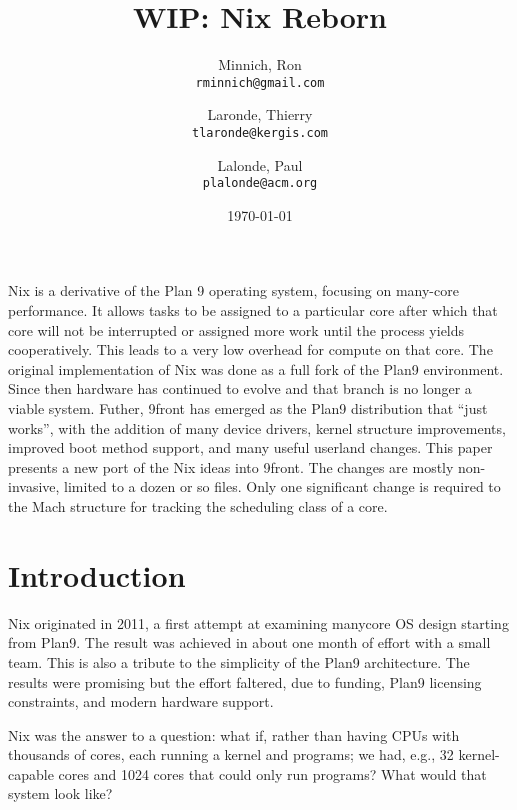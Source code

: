 \documentclass{article}
\title{WIP: Nix Reborn}
\author{Minnich, Ron\\
	\texttt{rminnich@gmail.com}
	\and
	Laronde, Thierry\\
	\texttt{tlaronde@kergis.com}
	\and
	Lalonde, Paul\\
	\texttt{plalonde@acm.org}
	}
\date{\today}
\begin{document}
 
\newcommand{\PAL}[1]{{\em PAL: #1}}
\maketitle 
\abstract
Nix is a derivative of the Plan 9 operating system\cite{Pike:19xx:PBL}, focusing on many-core performance. It allows tasks to be assigned to a particular core after which
that core will not be interrupted or assigned more work until the process yields cooperatively.  This leads to a very low overhead for compute on that core.
The original implementation of Nix \cite{Ballesteros2012} was done as a full fork of the Plan9 environment.  Since then hardware has continued to evolve and
that branch is no longer a viable system.
Futher, 9front has emerged as the Plan9 distribution that ``just works'', with the addition of many device drivers, kernel structure improvements, improved
 boot method support, and many useful userland changes.
This paper presents a new port of the Nix ideas into 9front.  The changes are mostly non-invasive, limited to a dozen or so files.  Only one significant change is required to the Mach structure for tracking the scheduling class of a core.

\section{Introduction}
Nix originated in 2011, a first attempt at examining manycore OS design starting from Plan9.
The result was achieved in about one month of effort with a small team\cite{Ballesteros2012}.  This is also a tribute to the simplicity of the Plan9
architecture. %
The results were promising but the effort faltered, due to funding, Plan9 licensing constraints, and modern hardware support.

Nix was the answer to a question: what if, rather than having CPUs with thousands of cores, each running a kernel and programs; we had, e.g., 32 kernel-capable cores and 1024 cores that could only run programs?
What would that system look like? 
\end{document}
